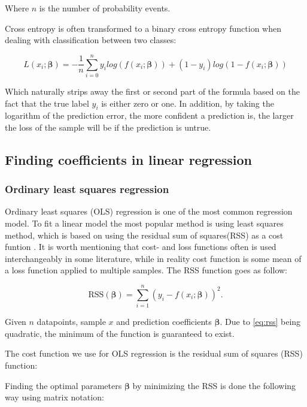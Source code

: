 \documentclass[../main.tex]{subfiles}
\begin{document}
Where $n$ is the number of probability events.

Cross entropy is often transformed to a binary cross entropy function when dealing with classification between two classes:

\begin{equation*}
    L(x_i; \boldsymbol{\beta})=-\frac{1}{n}\sum_{i=0}^{n}y_i log(f(x_i; \boldsymbol{\beta}))+(1-y_i)log(1-f(x_i; \boldsymbol{\beta}))
\end{equation*}

Which naturally strips away the first or second part of the formula based on the fact that the true label $y_i$ is either zero or one. In addition, by taking the logarithm of the prediction error, the more confident a prediction is, the larger the loss of the sample will be if the prediction is untrue.

\subsection{Finding coefficients in linear regression}
\subsubsection{Ordinary least squares regression}\label{sec:ols}
Ordinary least squares (OLS) regression is one of the most common regression model. To fit a linear model the most popular method is using least squares method, which is based on using the residual sum of squares(RSS) as a cost funtion \cite[ch.~2]{HastieTrevor2009EoSL}. It is worth mentioning that cost- and loss functions often is used interchangeably in some literature, while in reality cost function is some mean of a loss function applied to multiple samples. The RSS function goes as follow:

\begin{equation}
  \label{eq:rss}
  \text{RSS}(\boldsymbol{\beta}) = \sum_{i=1}^n (y_i -  f(x_i; \boldsymbol{\beta}))^2.
\end{equation}

Given $n$ datapoints, sample $x$ and prediction coefficients $\boldsymbol{\beta}$. Due to \cref{eq:rss} being quadratic, the minimum of the function is guaranteed to exist.

The cost function we use for OLS regression is the residual sum of squares (RSS) function:

Finding the optimal parameters $\boldsymbol{\beta}$ by minimizing the RSS is done the following way using matrix notation:
\end{document}
